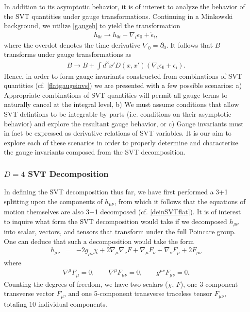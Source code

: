 \documentclass[10pt,letterpaper]{article}
\numberwithin{equation}{section}
\begin{document}
\indent In addition to its asymptotic behavior, it is of interest to analyze the behavior of the SVT quantities under gauge transformations. Continuing in a Minkowski background, we utilize \eqref{gaugeh} to yield the transformation
\begin{eqnarray}
h_{0i} \to h_{0i} + \nabla_i \epsilon_0  + \dot \epsilon_i,
\end{eqnarray}
where the overdot denotes the time derivative $\nabla_0 = \partial_0$. It follows that $B$ transforms under gauge transformations as
\begin{eqnarray}
B \to B + \int d^3x' D(x,x')(\nabla_i \epsilon_0  + \dot \epsilon_i). 
\end{eqnarray}
Hence, in order to form gauge invariants constructed from combinations of SVT quantities (cf. \eqref{flatgaugeinvs}) we are presented with a few possible scenarios: a) Appropriate combinations of SVT quantities will permit all gauge terms to naturally cancel at the integral level, b) We must assume conditions that allow SVT defintions to be integrable by parts (i.e. conditions on their asymptotic behavior) and explore the resultant gauge behavior, or c) Gauge invariants must in fact be expressed as derivative relations of SVT variables. It is our aim to explore each of these scenarios in order to properly determine and characterize the gauge invariants composed from the SVT decomposition.

\subsubsection{$D=4$ SVT Decomposition}
\label{sec:SVT Decomposition}
In defining the SVT decomposition thus far, we have first performed a 3+1 splitting upon the components of $h_{\mu\nu}$, from which it follows that the equations of motion themselves are also 3+1 decomposed (cf. \eqref{deinSVTflat}). It is of interest to inquire what form the SVT decomposition would take if we decomposed $h_{\mu\nu}$ into scalar, vectors, and tensors that transform under the full Poincare group. One can deduce that such a decomposition would take the form
\begin{eqnarray}
h_{\mu\nu} &=& -2g_{\mu\nu} \chi + 2\nabla_\mu\nabla_\nu F + \nabla_\mu F_\nu + \nabla_\nu F_{\mu} + 2 F_{\mu\nu} 
\end{eqnarray}
where 
\begin{eqnarray}
\nabla^\mu F_{\mu} = 0,\qquad \nabla^\mu F_{\mu\nu} = 0,\qquad g^{\mu\nu} F_{\mu\nu} = 0. 
\end{eqnarray}
Counting the degrees of freedom, we have two scalars ($\chi$, $F$), one 3-component transverse vector $F_\mu$, and one 5-component transverse traceless tensor $F_{\mu\nu}$, totaling 10 individual components. 
\end{document}
